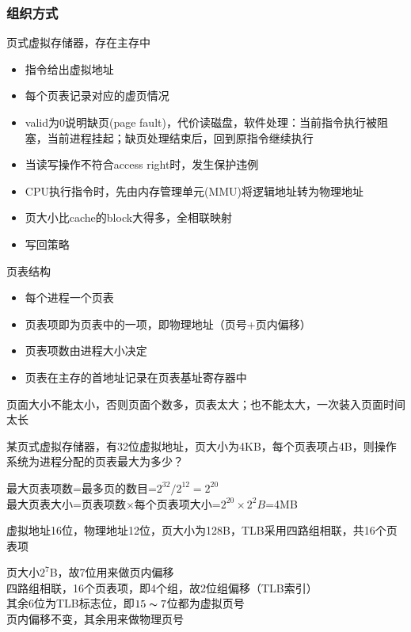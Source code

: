 \subsubsection{组织方式}
页式虚拟存储器，存在主存中
\begin{itemize}
	\item 指令给出虚拟地址
	\item 每个页表记录对应的虚页情况
	\item valid为0说明缺页(page fault)，代价读磁盘，软件处理：当前指令执行被阻塞，当前进程挂起；缺页处理结束后，回到原指令继续执行
	\item 当读写操作不符合access right时，发生保护违例
	\item CPU执行指令时，先由内存管理单元(MMU)将逻辑地址转为物理地址
	\item 页大小比cache的block大得多，全相联映射
	\item 写回策略
\end{itemize}
页表结构
\begin{itemize}
	\item 每个进程一个页表
	\item 页表项即为页表中的一项，即物理地址（页号+页内偏移）
	\item 页表项数由进程大小决定
	\item 页表在主存的首地址记录在页表基址寄存器中
\end{itemize}
页面大小不能太小，否则页面个数多，页表太大；也不能太大，一次装入页面时间太长
\begin{example}
某页式虚拟存储器，有32位虚拟地址，页大小为4KB，每个页表项占4B，则操作系统为进程分配的页表最大为多少？
\end{example}
\begin{analysis}
最大页表项数=最多页的数目=$2^{32}/2^{12}=2^{20}$\\
最大页表大小=页表项数$\times$每个页表项大小=$2^{20}\times 2^2B$=4MB
\end{analysis}
\begin{example}
虚拟地址16位，物理地址12位，页大小为128B，TLB采用四路组相联，共16个页表项
\end{example}
\begin{analysis}
页大小$2^7$B，故7位用来做页内偏移\\
四路组相联，16个页表项，即4个组，故2位组偏移（TLB索引）\\
其余6位为TLB标志位，即$15\thicksim 7$位都为虚拟页号\\
页内偏移不变，其余用来做物理页号
\end{analysis}

